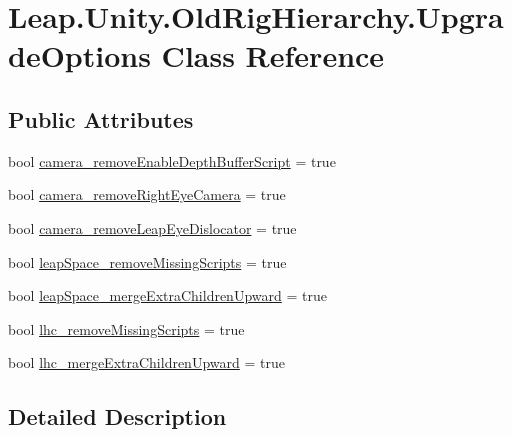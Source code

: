 \hypertarget{class_leap_1_1_unity_1_1_old_rig_hierarchy_1_1_upgrade_options}{}\section{Leap.\+Unity.\+Old\+Rig\+Hierarchy.\+Upgrade\+Options Class Reference}
\label{class_leap_1_1_unity_1_1_old_rig_hierarchy_1_1_upgrade_options}
\subsection*{Public Attributes}
\begin{DoxyCompactItemize}
\item 
bool \mbox{\hyperlink{class_leap_1_1_unity_1_1_old_rig_hierarchy_1_1_upgrade_options_a04fcb64256d2693fe1649f491e59a7d1}{camera\+\_\+remove\+Enable\+Depth\+Buffer\+Script}} = true
\item 
bool \mbox{\hyperlink{class_leap_1_1_unity_1_1_old_rig_hierarchy_1_1_upgrade_options_a57ef49dcd002094bce369b437ed7c3b9}{camera\+\_\+remove\+Right\+Eye\+Camera}} = true
\item 
bool \mbox{\hyperlink{class_leap_1_1_unity_1_1_old_rig_hierarchy_1_1_upgrade_options_a574c3a8a23a1a7edaacf09bfd3317299}{camera\+\_\+remove\+Leap\+Eye\+Dislocator}} = true
\item 
bool \mbox{\hyperlink{class_leap_1_1_unity_1_1_old_rig_hierarchy_1_1_upgrade_options_a797fb4b846240cb8785866005694167b}{leap\+Space\+\_\+remove\+Missing\+Scripts}} = true
\item 
bool \mbox{\hyperlink{class_leap_1_1_unity_1_1_old_rig_hierarchy_1_1_upgrade_options_aeab3e8a33b5a0e9d72bce7098d6a8081}{leap\+Space\+\_\+merge\+Extra\+Children\+Upward}} = true
\item 
bool \mbox{\hyperlink{class_leap_1_1_unity_1_1_old_rig_hierarchy_1_1_upgrade_options_a7b1ad80bb624f91b59f47946a436c082}{lhc\+\_\+remove\+Missing\+Scripts}} = true
\item 
bool \mbox{\hyperlink{class_leap_1_1_unity_1_1_old_rig_hierarchy_1_1_upgrade_options_a77b2f694059bde9437ec4df2dae8e743}{lhc\+\_\+merge\+Extra\+Children\+Upward}} = true
\end{DoxyCompactItemize}


\subsection{Detailed Description}



